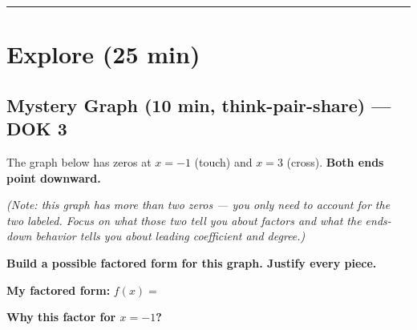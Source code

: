 \documentclass[11pt]{article}
\newcommand{\framedline}[1]{\underline{\hspace{#1}}}
\begin{document}
\vspace{0.5em}
\hrule

\section*{Explore (25 min)}

\subsection*{Mystery Graph (10 min, think-pair-share) --- DOK 3}

The graph below has zeros at $x = -1$ (touch) and $x = 3$ (cross). \textbf{Both ends point downward.}

\begin{center}
\end{center}

\textit{(Note: this graph has more than two zeros --- you only need to account for the two labeled. Focus on what those two tell you about factors and what the ends-down behavior tells you about leading coefficient and degree.)}

\vspace{0.5em}
\textbf{Build a possible factored form for this graph. Justify every piece.}

\textbf{My factored form:} $f(x) = $ \framedline{4.5in}

\vspace{3pt}
\textbf{Why this factor for $x = -1$?} \\
\framedline{5.5in} \\[5pt]
\framedline{5.5in}
\end{document}
